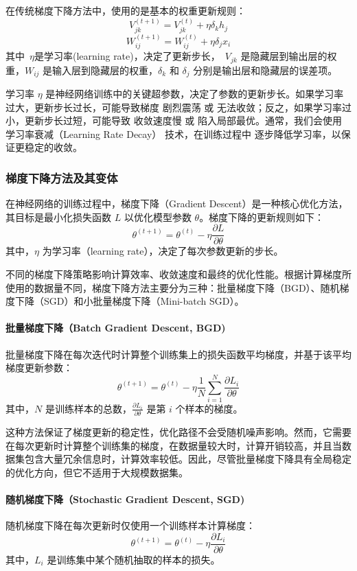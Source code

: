 在传统梯度下降方法中，使用的是基本的权重更新规则：
$$
V_{jk}^{(t+1)} =V_{jk}^{(t)} +\eta \delta_k h_j
$$
$$
W_{ij}^{(t+1)} =W_{ij}^{(t)} +\eta \delta_j x_i
$$
其中~$\eta$是学习率(learning rate)，决定了更新步长，~$V_{jk}$ 是隐藏层到输出层的权重，$ W_{ij} $ 是输入层到隐藏层的权重，$\delta_k$ 和 $\delta_j$ 分别是输出层和隐藏层的误差项。

学习率 $\eta$ 是神经网络训练中的关键超参数，决定了参数的更新步长。如果学习率过大，更新步长过长，可能导致梯度 剧烈震荡 或 无法收敛；反之，如果学习率过小，更新步长过短，可能导致 收敛速度慢 或 陷入局部最优。通常，我们会使用 学习率衰减（Learning Rate Decay） 技术，在训练过程中 逐步降低学习率，以保证更稳定的收敛。

\subsubsection*{梯度下降方法及其变体}
在神经网络的训练过程中，梯度下降（Gradient Descent）是一种核心优化方法，其目标是最小化损失函数 \( L \) 以优化模型参数 \( \theta \)。梯度下降的更新规则如下：
\begin{equation}
\theta^{(t+1)} = \theta^{(t)} - \eta \frac{\partial L}{\partial \theta}
\end{equation}
其中，\(\eta\) 为学习率（learning rate），决定了每次参数更新的步长。

不同的梯度下降策略影响计算效率、收敛速度和最终的优化性能。根据计算梯度所使用的数据量不同，梯度下降方法主要分为三种：批量梯度下降（BGD）、随机梯度下降（SGD）和小批量梯度下降（Mini-batch SGD）。

\paragraph*{批量梯度下降（Batch Gradient Descent, BGD)}
批量梯度下降在每次迭代时计算整个训练集上的损失函数平均梯度，并基于该平均梯度更新参数：
\begin{equation}
\theta^{(t+1)} = \theta^{(t)} - \eta \frac{1}{N} \sum_{i=1}^{N} \frac{\partial L_i}{\partial \theta}
\end{equation}
其中，\(N\) 是训练样本的总数，\(\frac{\partial L_i}{\partial \theta}\) 是第 \(i\) 个样本的梯度。

这种方法保证了梯度更新的稳定性，优化路径不会受随机噪声影响。然而，它需要在每次更新时计算整个训练集的梯度，在数据量较大时，计算开销较高，并且当数据集包含大量冗余信息时，计算效率较低。因此，尽管批量梯度下降具有全局稳定的优化方向，但它不适用于大规模数据集。

\paragraph*{随机梯度下降（Stochastic Gradient Descent, SGD)}
随机梯度下降在每次更新时仅使用一个训练样本计算梯度：
\begin{equation}
\theta^{(t+1)} = \theta^{(t)} - \eta \frac{\partial L_i}{\partial \theta}
\end{equation}
其中，\( L_i \) 是训练集中某个随机抽取的样本的损失。

